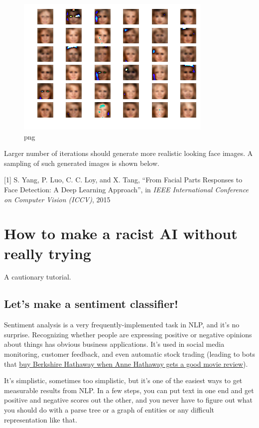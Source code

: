 \documentclass[]{book}
\theoremstyle{definition}
\theoremstyle{definition}
\theoremstyle{definition}
\theoremstyle{remark}
\begin{document}
\begin{figure}
\centering
\includegraphics{Synthesizing-Celebs-BEGAN_files/Synthesizing-Celebs-BEGAN_29_0.png}
\caption{png}
\end{figure}

Larger number of iterations should generate more realistic looking face
images. A sampling of such generated images is shown below.

{[}1{]} S. Yang, P. Luo, C. C. Loy, and X. Tang, ``From Facial Parts
Responses to Face Detection: A Deep Learning Approach'', in \emph{IEEE
International Conference on Computer Vision (ICCV)}, 2015

\chapter{How to make a racist AI without really
trying}\label{how-to-make-a-racist-ai-without-really-trying}

A cautionary tutorial.

\section{Let's make a sentiment
classifier!}\label{lets-make-a-sentiment-classifier}

Sentiment analysis is a very frequently-implemented task in NLP, and
it's no surprise. Recognizing whether people are expressing positive or
negative opinions about things has obvious business applications. It's
used in social media monitoring, customer feedback, and even automatic
stock trading (leading to bots that
\href{https://www.theatlantic.com/technology/archive/2011/03/does-anne-hathaway-news-drive-berkshire-hathaways-stock/72661/}{buy
Berkshire Hathaway when Anne Hathaway gets a good movie review}).

It's simplistic, sometimes too simplistic, but it's one of the easiest
ways to get measurable results from NLP. In a few steps, you can put
text in one end and get positive and negative scores out the other, and
you never have to figure out what you should do with a parse tree or a
graph of entities or any difficult representation like that.
\end{document}
